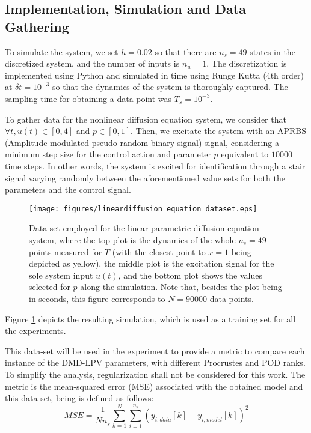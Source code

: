 \subsection{Implementation, Simulation and Data Gathering}

To simulate the system, we set $h = 0.02$ so that there are $n_s = 49$ states in the discretized system, and the number of inputs is $n_u = 1$.
%
The discretization is implemented using Python and simulated in time using Runge Kutta (4th order) at $\delta t = 10^{-3}$ so that the dynamics of the system is thoroughly captured.
%
The sampling time for obtaining a data point was $T_s =  10^{-3}$.

To gather data for the nonlinear diffusion equation system, we consider that $\forall t, u(t) \in [0,4]$ and $p \in [0,1]$.
%
Then, we excitate the system with an APRBS (Amplitude-modulated pseudo-random binary signal) signal, considering a minimum step size for the control action and parameter $p$ equivalent to $10000$ time steps.
%
In other words, the system is excited for identification through a stair signal varying randomly between the aforementioned value sets for both the parameters and the control signal.

\begin{figure}[h!]
    \centering
    \texttt{[image: figures/lineardiffusion\_equation\_dataset.eps]}
    \caption{Data-set employed for the linear parametric diffusion equation system, where the top plot is the dynamics of the whole $n_s = 49$ points measured for $T$ (with the closest point to $x=1$ being depicted as yellow), the middle plot is the excitation signal for the sole system input $u(t)$, and the bottom plot shows the values selected for $p$ along the simulation. Note that, besides the plot being in seconds, this figure corresponds to $N = 90000$ data points.}
    \label{fig:lineardiff_equation_dataset}
\end{figure}

Figure \ref{fig:lineardiff_equation_dataset} depicts the resulting simulation, which is used as a training set for all the experiments.



This data-set will be used in the experiment to provide a metric to compare each instance of the DMD-LPV parameters, with different Procrustes and POD ranks.
%
To simplify the analysis, regularization shall not be considered for this work.
%
The metric is the mean-squared error (MSE) associated with the obtained model and this data-set, being is defined as follows:
\begin{equation}
    MSE = \frac{1}{Nn_s}\sum_{k=1}^N\sum_{i=1}^{n_s}\left(y_{i,data}[k] - y_{i,model}[k]\right)^2
\end{equation}




